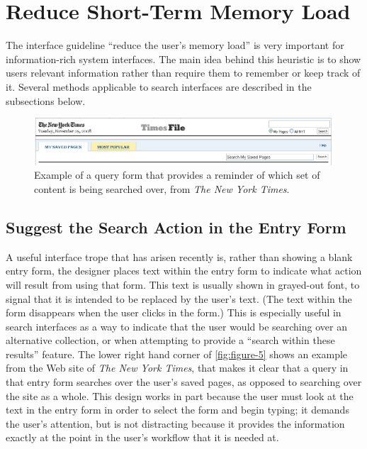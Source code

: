 \documentclass[sigconf,nonacm,screen,pbalance]{acmart}
\begin{document}
\section{Reduce Short-Term Memory Load}

The interface guideline ``reduce the user's memory load'' is very important for information-rich system
interfaces. The main idea behind this heuristic is to show users relevant information rather than require
them to remember or keep track of it. Several methods applicable to search interfaces are described in the
subsections below.

\begin{figure}[ht]
    \vspace{-5pt}
    \includegraphics[width=\columnwidth]{./nytimes-searchbox.png}
    \vspace{-20pt}
    \caption{Example of a query form that provides a reminder of which set of
    content is being searched over, from {\em  The New York Times}.}
    \label{fig:figure-5}
    \vspace{-5pt}
\end{figure}

\subsection{Suggest the Search Action in the Entry Form}

A useful interface trope that has arisen recently is, rather than showing a blank entry form, the
designer places text within the entry form to indicate what action will result from using that form.
This text is usually shown in grayed-out font, to signal that it is intended to be replaced by the
user's text. (The text within the form disappears when the user clicks in the form.) This is especially
useful in search interfaces as a way to indicate that the user would be searching over an alternative
collection, or when attempting to provide a ``search within these results'' feature. The lower right hand
corner of \autoref{fig:figure-5} shows an
example from the Web site of {\em  The New York Times}, that makes it clear that a query in that entry
form searches over the user's saved pages, as opposed to searching over the site as a whole. This design
works in part because the user must look at the text in the entry form in order to select the form and
begin typing; it demands the user's attention, but is not distracting because it provides the
information exactly at the point in the user's workflow that it is needed at.
\end{document}
